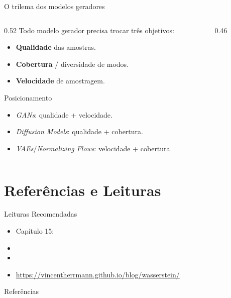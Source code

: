 \documentclass[aspectratio=169,xcolor=dvipsnames]{beamer}
\begin{document}
  \begin{frame}{O trilema dos modelos geradores}
    \begin{columns}[T]
      \begin{column}{0.52\textwidth}
        Todo modelo gerador precisa trocar três objetivos:
        \begin{itemize}
          \item \textbf{Qualidade} das amostras.
          \item \textbf{Cobertura} / diversidade de modos.
          \item \textbf{Velocidade} de amostragem.
        \end{itemize}
        \vspace{0.3em}
        \begin{block}{Posicionamento}
          \begin{itemize}
            \item \textit{GANs}: qualidade + velocidade.
            \item \textit{Diffusion Models}: qualidade + cobertura.
            \item \textit{VAEs}/\textit{Normalizing Flows}: velocidade +
            cobertura.
          \end{itemize}
        \end{block}
      \end{column}
      \begin{column}{0.46\textwidth}
        \centering
        \resizebox{\linewidth}{!}{\generativetrilemma[gan]}
      \end{column}
    \end{columns}
  \end{frame}

  \section*{Referências e Leituras}

  \begin{frame}{Leituras Recomendadas}
    \leiturasize
    \begin{itemize}
      \item Capítulo 15: 
      \item {}
      \item {}
      \item \url{https://vincentherrmann.github.io/blog/wasserstein/}
    \end{itemize}
  \end{frame}

  \begin{frame}[allowframebreaks]{Referências}
    \sloppy
    \printbibliography[heading=none]
  \end{frame}
\end{document}
